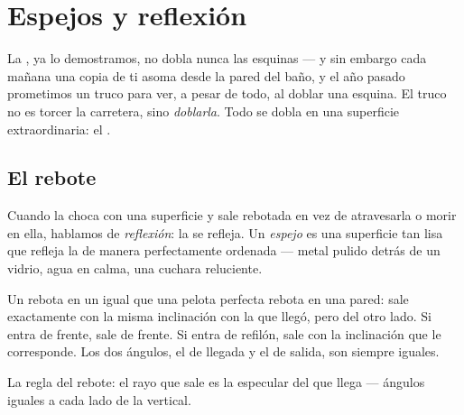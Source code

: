 \chapter{Espejos y reflexión}\label{ch:g5:mirrors-reflection}

La , ya lo demostramos, no dobla nunca las esquinas --- y sin
embargo cada mañana una copia de ti asoma desde la pared del baño, y
el año pasado prometimos un truco para ver, a pesar de todo, al doblar
una esquina. El truco no es torcer la carretera, sino \emph{doblarla}.
Todo se dobla en una superficie extraordinaria: el .

\section{El rebote}

\begin{definition}[La reflexión]\label{def:g5:mirrors-reflection:reflection}
Cuando la  choca con una superficie y sale rebotada en vez de
atravesarla o morir en ella, hablamos de
\emph{reflexión}: la  se refleja. Un
\emph{espejo} es una superficie tan lisa que refleja la
 de manera perfectamente ordenada --- metal pulido detrás de un
vidrio, agua en calma, una cuchara reluciente.
\end{definition}

\begin{proposition}\label{prop:g5:mirrors-reflection:bounce}
Un  rebota en un  igual que una pelota perfecta
rebota en una pared: sale exactamente con la misma inclinación con la
que llegó, pero del otro lado. Si entra de frente, sale de frente. Si
entra de refilón, sale con la inclinación que le corresponde. Los dos
ángulos, el de llegada y el de salida, son siempre iguales.
\end{proposition}

\begin{omfigure}

{\small La regla del rebote: el rayo que sale es la 
especular del que llega --- ángulos iguales a cada lado de la
vertical.}
\end{omfigure}

